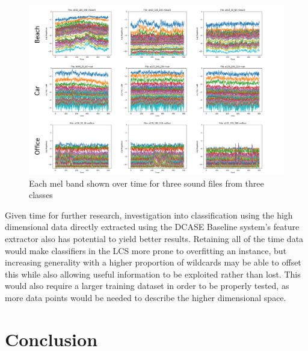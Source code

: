 \documentclass[11pt]{article}
\begin{document}
\begin{figure}[!htbp]
	\centering
	\includegraphics[width=\textwidth]{figures/flipItBoyo.png}
	\caption{Each mel band shown over time for three sound files from three classes}
	\label{fig:flipItBoyo}
\end{figure}

Given time for further research, investigation into classification using the high dimensional data directly extracted using the DCASE Baseline system's feature extractor also has potential to yield better results. Retaining all of the time data would make classifiers in the LCS more prone to overfitting an instance, but increasing generality with a higher proportion of wildcards may be able to offset this while also allowing useful information to be exploited rather than lost. This would also require a larger training dataset in order to be properly tested, as more data points would be needed to describe the higher dimensional space.



\pagebreak
\section{Conclusion}
\end{document}
